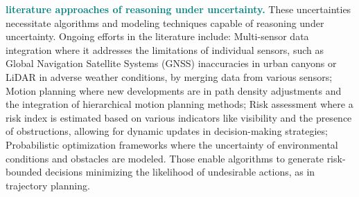 \textcolor{teal}{\textbf{literature approaches of reasoning under uncertainty.}} These uncertainties necessitate algorithms and modeling techniques capable of reasoning under uncertainty. Ongoing efforts in the literature include: Multi-sensor data integration \cite{vargas2021overview} where it addresses the limitations of individual sensors, such as Global Navigation Satellite Systems (GNSS) inaccuracies in urban canyons or LiDAR in adverse weather conditions, by merging data from various sensors; Motion planning \cite{tang2022driving} where new developments are in path density adjustments and the integration of hierarchical motion planning methods; Risk assessment \cite{wang2021risk} where a risk index is estimated based on various indicators like visibility and the presence of obstructions, allowing for dynamic updates in decision-making strategies; Probabilistic optimization frameworks \cite{han2022non} where the uncertainty of environmental conditions and obstacles are modeled. Those enable algorithms to generate risk-bounded decisions minimizing the likelihood of undesirable actions, as in trajectory planning.

